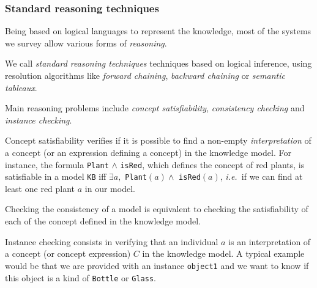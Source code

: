 \documentclass[a4paper, twocolumn]{article}
\newcommand{\ie}{{\textit{i.e.\ }}}
\newcommand{\concept}[1]{{\footnotesize \texttt{#1}}}
\begin{document}
\begin{scriptsize}
\begin{center}
\end{center}
\end{scriptsize}


\subsubsection{Standard reasoning techniques}

Being based on logical languages to represent the knowledge, most of the
systems we survey allow various forms of \emph{reasoning}.

We call \emph{standard reasoning techniques} techniques based on logical
inference, using resolution algorithms like \emph{forward chaining},
\emph{backward chaining} or \emph{semantic tableaux}.

Main reasoning problems include \emph{concept satisfiability},
\emph{consistency checking} and \emph{instance checking}.

Concept satisfiability verifies if it is possible to find a non-empty
\emph{interpretation} of a concept (or an expression defining a concept) in the
knowledge model. For instance, the formula \concept{Plant} $\land$
\concept{isRed}, which defines the concept of red plants, is satisfiable in a
model \concept{KB} iff $\exists a, $ \concept{Plant}$(a) \land$
\concept{isRed}$(a)$, \ie if we can find at least one red plant $a$ in our
model.

Checking the consistency of a model is equivalent to checking the
satisfiability of each of the concept defined in the knowledge model.

Instance checking consists in verifying that an individual $a$ is an
interpretation of a concept (or concept expression) $C$ in the knowledge model.
A typical example would be that we are provided with an instance
\concept{object1} and we want to know if this object is a kind of
\concept{Bottle} or \concept{Glass}.
\end{document}
